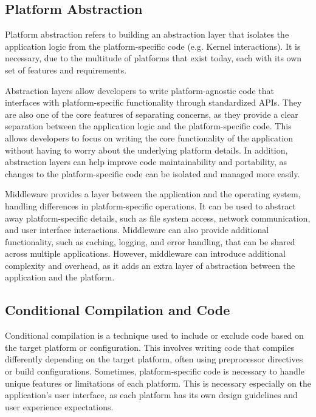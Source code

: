 \subsection{Platform Abstraction}
Platform abstraction refers to building an abstraction layer that isolates the application logic from the platform-specific code (e.g. Kernel interactions).
It is necessary, due to the multitude of platforms that exist today, each with its own set of features and requirements.

\par
Abstraction layers allow developers to write platform-agnostic code that interfaces with platform-specific functionality through standardized APIs.
They are also one of the core features of separating concerns, as they provide a clear separation between the application logic and the platform-specific code.
This allows developers to focus on writing the core functionality of the application without having to worry about the underlying platform details.
In addition, abstraction layers can help improve code maintainability and portability, as changes to the platform-specific code can be isolated and managed more easily.

\par
Middleware provides a layer between the application and the operating system, handling differences in platform-specific operations.
It can be used to abstract away platform-specific details, such as file system access, network communication, and user interface interactions.
Middleware can also provide additional functionality, such as caching, logging, and error handling, that can be shared across multiple applications.
However, middleware can introduce additional complexity and overhead, as it adds an extra layer of abstraction between the application and the platform.

\subsection{Conditional Compilation and Code}
Conditional compilation is a technique used to include or exclude code based on the target platform or configuration.
This involves writing code that compiles differently depending on the target platform, often using preprocessor directives or build configurations.
Sometimes, platform-specific code is necessary to handle unique features or limitations of each platform.
This is necessary especially on the application's user interface, as each platform has its own design guidelines and user experience expectations.



